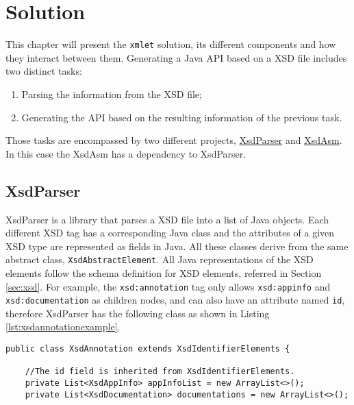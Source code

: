\chapter{Solution}
\label{cha:solution}

\sloppy

This chapter will present the \texttt{xmlet} solution, its different components and how they interact between them. Generating a Java \ac{API} based on a \ac{XSD} file includes two distinct tasks:

\begin{enumerate}
\item Parsing the information from the \ac{XSD} file;
\item Generating the \ac{API} based on the resulting information of the previous task.
\end{enumerate}

\noindent
Those tasks are encompassed by two different projects, \hyperref[sec:xsdparser]{XsdParser} and \hyperref[sec:xsdasm]{XsdAsm}. In this case the XsdAsm has a dependency to XsdParser.

\section{XsdParser} %
\label{sec:xsdparser}

XsdParser is a library that parses a \ac{XSD} file into a list of Java objects. Each different \ac{XSD} tag has a corresponding Java class and the  attributes of a given \ac{XSD} type are represented as fields in Java. All these classes derive from the same abstract class, \texttt{XsdAbstractElement}. All Java representations of the \ac{XSD} elements follow the schema definition for \ac{XSD} elements, referred in Section \ref{sec:xsd}. For example, the \texttt{xsd:annotation} tag only allows \texttt{xsd:appinfo} and \texttt{xsd:documentation} as children nodes, and can also have an attribute named \texttt{id}, therefore XsdParser has the following class as shown in Listing \ref{lst:xsdannotationexample}.

\bigskip


\begin{minipage}{\linewidth}
\begin{lstlisting}[caption={XsdAnnotation class (Simplified)}, label={lst:xsdannotationexample}]
public class XsdAnnotation extends XsdIdentifierElements {

    //The id field is inherited from XsdIdentifierElements.
    private List<XsdAppInfo> appInfoList = new ArrayList<>();
    private List<XsdDocumentation> documentations = new ArrayList<>();
\end{lstlisting}
\end{minipage}

